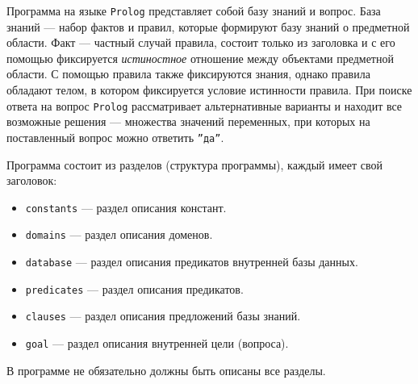 Программа на языке \texttt{Prolog} представляет собой базу знаний и вопрос. База знаний --- набор фактов и правил, которые формируют базу знаний о предметной области. Факт --- частный случай правила, состоит только из заголовка и с его помощью фиксируется \textit{истиностное} отношение между объектами предметной области. С помощью правила также фиксируются знания, однако правила обладают телом, в котором фиксируется условие истинности правила. При поиске ответа на вопрос \texttt{Prolog} рассматривает альтернативные варианты и находит все возможные решения --- множества значений переменных, при которых на поставленный вопрос можно ответить \texttt{''да''}.

Программа состоит из разделов (структура программы), каждый имеет свой заголовок:
\begin{itemize}
	\item \texttt{constants} --- раздел описания констант.
	\item \texttt{domains} --- раздел описания доменов.
	\item \texttt{database} --- раздел описания предикатов внутренней базы данных.
	\item \texttt{predicates} --- раздел описания предикатов.
	\item \texttt{clauses} --- раздел описания предложений базы знаний.
	\item \texttt{goal} --- раздел описания внутренней цели (вопроса).
\end{itemize}

В программе не обязательно должны быть описаны все разделы.